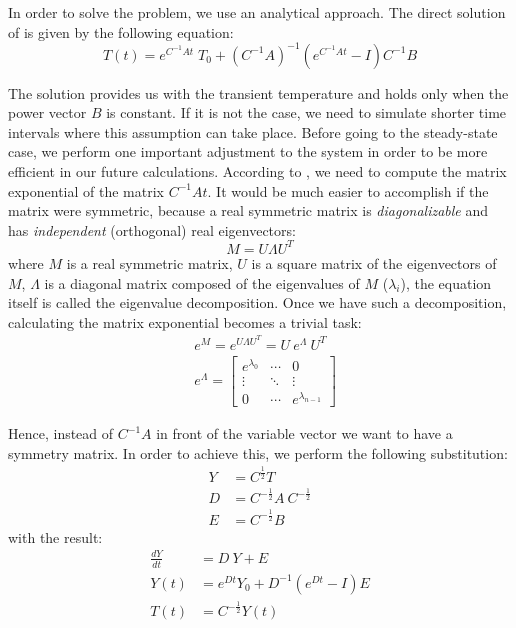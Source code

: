 In order to solve the problem, we use an analytical approach. The direct solution of  is given by the following equation:
\begin{equation} \label{eq:solution}
  T(t) = e^{C^{-1}A t} \; T_0 + (C^{-1} A)^{-1}(e^{C^{-1}A t} - I)C^{-1} B
\end{equation}

The solution provides us with the transient temperature and holds only when the power vector $B$ is constant. If it is not the case, we need to simulate shorter time intervals where this assumption can take place. Before going to the steady-state case, we perform one important adjustment to the system in order to be more efficient in our future calculations. According to , we need to compute the matrix exponential of the matrix $C^{-1} A t$. It would be much easier to accomplish if the matrix were symmetric, because a real symmetric matrix is \emph{diagonalizable} and has \emph{independent} (orthogonal) real eigenvectors:
\begin{equation} \label{eq:eigenvalue-decomposition}
  M = U \Lambda U^T
\end{equation}
where $M$ is a real symmetric matrix, $U$ is a square matrix of the eigenvectors of $M$, $\Lambda$ is a diagonal matrix composed of the eigenvalues of $M$ ($\lambda_i$), the equation itself is called the eigenvalue decomposition. Once we have such a decomposition, calculating the matrix exponential becomes a trivial task:
\begin{align}
  & e^M = e^{U \Lambda U^T} = U \: e^{\Lambda} \: U^T \nonumber \\
  & e^{\Lambda} = \left[
      \begin{array}{ccc}
        e^{\lambda_0} & \cdots & 0 \\
        \vdots & \ddots & \vdots \\
        0 & \cdots & e^{\lambda_{n - 1}}
      \end{array}
    \right] \nonumber
\end{align}

Hence, instead of $C^{-1} A$ in front of the variable vector we want to have a symmetry matrix. In order to achieve this, we perform the following substitution:
\begin{align*}
  Y & = C^{\frac{1}{2}} T \\
  D & = C^{-\frac{1}{2}} A \: C^{-\frac{1}{2}} \\
  E & = C^{-\frac{1}{2}} B
\end{align*}
with the result:
\begin{align}
  \frac{dY}{dt} & = D \: Y + E \nonumber \\
  Y(t) & = e^{D t} Y_0 + D^{-1} (e^{D t} - I) E \label{eq:modified-solution} \\
  T(t) & = C^{-\frac{1}{2}} Y(t) \label{eq:finalization}
\end{align}

